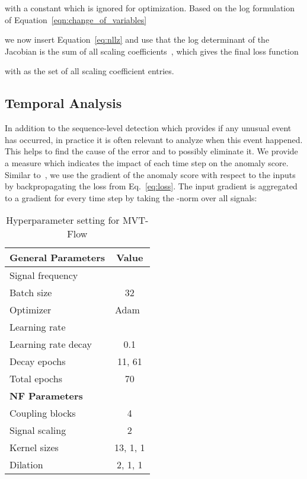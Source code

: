 \documentclass[journal]{IEEEtran}
\begin{document}
with a constant  which is ignored for optimization.
Based on the log formulation of Equation~\ref{eqn:change_of_variables}

we now insert Equation~\ref{eq:nllz} and use that the log determinant of the Jacobian is the sum of all scaling coefficients~\cite{realnvp}, which gives the final loss function

with  as the set of all scaling coefficient entries.

\subsection{Temporal Analysis}
\label{temp_analysis}
In addition to the sequence-level detection which provides if any unusual event has occurred, in practice it is often relevant to analyze when this event happened.
This helps to find the cause of the error and to possibly eliminate it.
We provide a measure which indicates the impact of each time step on the anomaly score.
Similar to~\cite{differnet}, we use the gradient of the anomaly score with respect to the inputs by backpropagating the loss from Eq.~\ref{eq:loss}.
The input gradient  is aggregated to a gradient for every time step  by taking the -norm over all signals:



\begin{table}[b]
\centering
\begin{tabular}{lc}
\hline
\rowcolor[HTML]{EEEEEE}
\textbf{General Parameters} & Value \\ \hline
Signal frequency &   \\ \hline 
Batch size & 32  \\ \hline
Optimizer & Adam~\cite{adam} \\ \hline
Learning rate  &  \\ \hline 
Learning rate decay & 0.1 \\ \hline
Decay epochs &  11, 61 \\ \hline
Total epochs & 70 \\ \hline
\rowcolor[HTML]{EEEEEE}
\textbf{NF Parameters} &  \\ \hline
Coupling blocks  & 4 \\ \hline 
Signal scaling  & 2 \\ \hline 
Kernel sizes  & 13, 1, 1 \\ \hline 
Dilation  & 2, 1, 1 \\ \hline 
\end{tabular}
\caption{Hyperparameter setting for MVT-Flow}
\label{table:hp}
    \vspace{-3.5mm}
\end{table}
\end{document}
